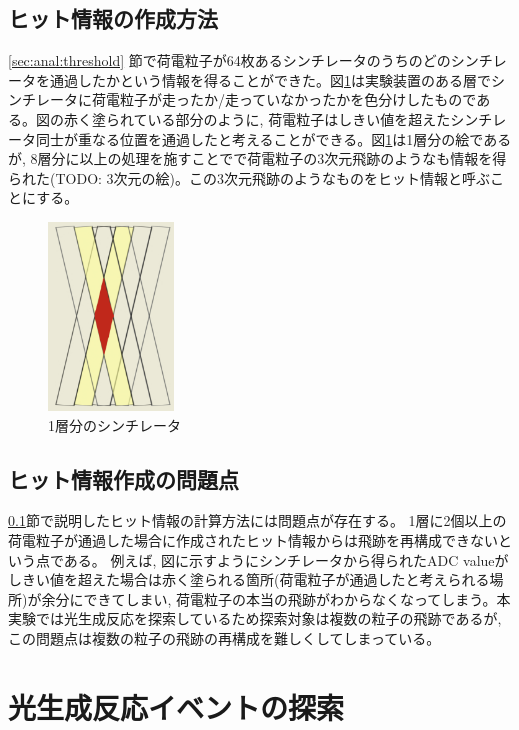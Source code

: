 \subsection{ヒット情報の作成方法}\label{subsec:anal:make_hit}
\ref{sec:anal:threshold} 節で荷電粒子が64枚あるシンチレータのうちのどのシンチレータを通過したかという情報を得ることができた。図\ref{fig:igata01}は実験装置のある層でシンチレータに荷電粒子が走ったか/走っていなかったかを色分けしたものである。図の赤く塗られている部分のように, 荷電粒子はしきい値を超えたシンチレータ同士が重なる位置を通過したと考えることができる。図\ref{fig:igata01}は1層分の絵であるが, 8層分に以上の処理を施すことでで荷電粒子の3次元飛跡のようなも情報を得られた(TODO: 3次元の絵)。この3次元飛跡のようなものをヒット情報と呼ぶことにする。
\begin{figure}[H]
    \centering
    \includegraphics[height=5.0cm]{img/igata_01.png}
    \caption{1層分のシンチレータ}
    \label{fig:igata01}
\end{figure}
\subsection{ヒット情報作成の問題点}
\ref{subsec:anal:make_hit}節で説明したヒット情報の計算方法には問題点が存在する。
1層に2個以上の荷電粒子が通過した場合に作成されたヒット情報からは飛跡を再構成できないという点である。
例えば, 図に示すようにシンチレータから得られたADC valueがしきい値を超えた場合は赤く塗られる箇所(荷電粒子が通過したと考えられる場所)が余分にできてしまい, 荷電粒子の本当の飛跡がわからなくなってしまう。本実験では光生成反応を探索しているため探索対象は複数の粒子の飛跡であるが, この問題点は複数の粒子の飛跡の再構成を難しくしてしまっている。

\section{光生成反応イベントの探索}